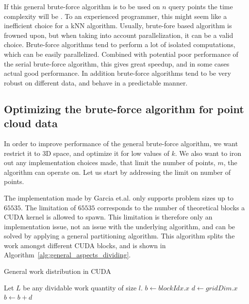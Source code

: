 If this general brute-force algorithm is to be used on $n$ query points the time complexity will be . To an experienced programmer, this might seem like a inefficient choice for a kNN algorithm. Usually, brute-fore based algorithm is  frowned upon, but when taking into account parallelization, it can be a valid choice. Brute-force algorithms tend to perform a lot of isolated computations, which can be easily parallelized. Combined with potential poor performance of the serial brute-force algorithm, this gives great speedup, and in some cases actual good performance. In addition brute-force algorithms tend to be very robust on different data, and behave in a predictable manner.

\subsection{Optimizing the brute-force algorithm for point cloud data} %
\label{sub:continuing_on_garcia_s_path} 

In order to improve performance of the general brute-force algorithm, we want restrict it to 3D space, and optimize it for low values of $k$. We also want to iron out any implementation choices made, that limit the number of points, $m$, the algorithm can operate on. Let us start by addressing the limit on number of points.

The implementation made by Garcia et.al. only supports problem sizes up to $65535$. The limitation of $65535$ corresponds to the number of theoretical blocks a CUDA kernel is allowed to spawn. This limitation is therefore only an implementation issue, not an issue with the underlying algorithm, and can be solved by applying a general partitioning algorithm. This algorithm splits the work amongst different CUDA blocks, and is shown in Algorithm~\ref{alg:general_aspects_dividing}.

\begin{algorithm}[ht]
\caption{General work distribution in CUDA}
\label{alg:general_aspects_dividing}
\begin{algorithmic}
\State Let $L$ be any dividable work quantity of size $l$.
    \State $b \gets blockIdx.x$ 
    \State $d \gets gridDim.x$ 
    \State {}
    \State $b \gets b + d$
    \EndWhile
    \EndFunction
\end{algorithmic}
\end{algorithm}

